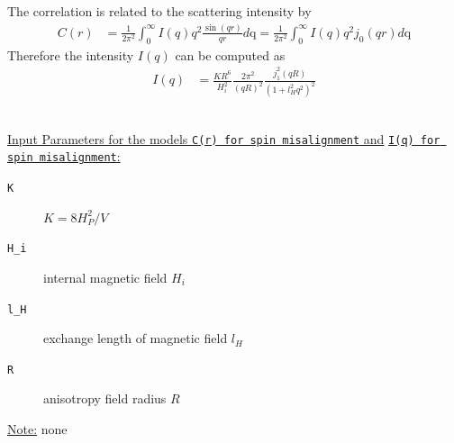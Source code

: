 The correlation is related to the scattering intensity by
\begin{align}
C(r) &= \frac{1}{2\pi^2} \int_0^\infty I(q) q^2
\frac{\sin(qr)}{qr}d\text{q}
 = \frac{1}{2\pi^2} \int_0^\infty I(q) q^2 j_0(qr) d\text{q}
\end{align}
Therefore the intensity $I(q)$ can be
computed as
\begin{align}
I(q) & = \frac{K R^6}{H_i^2}
\frac{2\pi^2}{\left(qR\right)^2}\frac{j_1^2(qR)}{\left(1+l_H^2q^2\right)^2}
\end{align}

\vspace{5mm}

\hspace{1pt}\\
\uline{Input Parameters for the models \texttt{C(r) for spin
misalignment} and} \newline \uline{\texttt{I(q) for spin misalignment}:}\\
\begin{description}
\item[\texttt{K}] $K=8H^2_P/V$
\item[\texttt{H\_i}] internal magnetic field $H_i$
\item[\texttt{l\_H}] exchange length of magnetic field $l_H$
\item[\texttt{R}] anisotropy field radius $R$
\end{description}

\noindent\uline{Note:}
none


